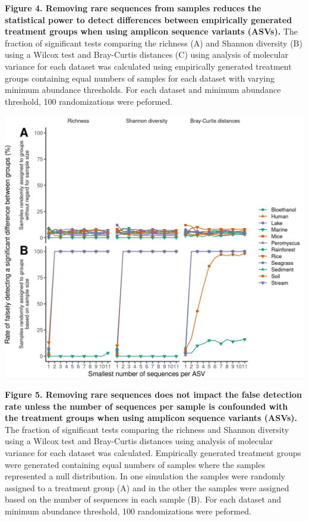 \documentclass[
]{article}
\begin{document}
\textbf{Figure 4. Removing rare sequences from samples reduces the
statistical power to detect differences between empirically generated
treatment groups when using amplicon sequence variants (ASVs).} The
fraction of significant tests comparing the richness (A) and Shannon
diversity (B) using a Wilcox test and Bray-Curtis distances (C) using
analysis of molecular variance for each dataset was calculated using
empirically generated treatment groups containing equal numbers of
samples for each dataset with varying minimum abundance thresholds. For
each dataset and minimum abundance threshold, 100 randomizations were
peformed.

\newpage

\includegraphics{figure_5.png}

\textbf{Figure 5. Removing rare sequences does not impact the false
detection rate unless the number of sequences per sample is confounded
with the treatment groups when using amplicon sequence variants (ASVs).}
The fraction of significant tests comparing the richness and Shannon
diversity using a Wilcox test and Bray-Curtis distances using analysis
of molecular variance for each dataset was calculated. Empirically
generated treatment groups were generated containing equal numbers of
samples where the samples represented a null distribution. In one
simulation the samples were randomly assigned to a treatment group (A)
and in the other the samples were assigned based on the number of
sequences in each sample (B). For each dataset and minimum abundance
threshold, 100 randomizations were peformed.
\end{document}
